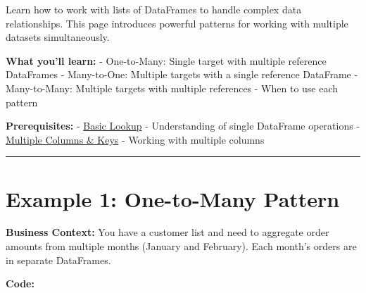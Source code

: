 \documentclass[
  letterpaper,
]{scrbook}
\begin{document}
Learn how to work with lists of DataFrames to handle complex data
relationships. This page introduces powerful patterns for working with
multiple datasets simultaneously.

\textbf{What you'll learn:} - One-to-Many: Single target with multiple
reference DataFrames - Many-to-One: Multiple targets with a single
reference DataFrame - Many-to-Many: Multiple targets with multiple
references - When to use each pattern

\textbf{Prerequisites:} - \href{examples-to-01-basic.html}{Basic Lookup}
- Understanding of single DataFrame operations -
\href{examples-to-02-multiple.html}{Multiple Columns \& Keys} - Working
with multiple columns

\begin{center}\rule{0.5\linewidth}{0.5pt}\end{center}

\section{Example 1: One-to-Many
Pattern}\label{example-1-one-to-many-pattern}

\textbf{Business Context:} You have a customer list and need to
aggregate order amounts from multiple months (January and February).
Each month's orders are in separate DataFrames.

\textbf{Code:}
\end{document}
